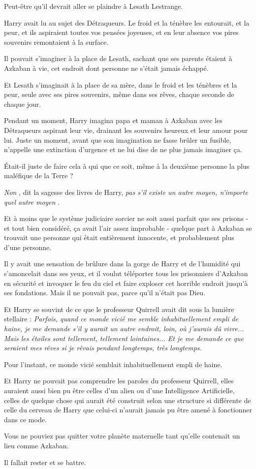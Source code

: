 Peut-être qu'il devrait aller se plaindre à Lesath Lestrange.

Harry avait lu au sujet des Détraqueurs. Le froid et la ténèbre les entourait, et la peur, et ils aspiraient toutes vos pensées joyeuses, et en leur absence vos pires souvenirs remontaient à la surface.

Il pouvait s'imaginer à la place de Lesath, sachant que ses parents étaient à Azkaban à vie, cet endroit dont personne ne s'était jamais échappé.

Et Lesath s'imaginait à la place de sa mère, dans le froid et les ténèbres et la peur, seule avec ses pires souvenirs, même dans ses rêves, chaque seconde de chaque jour.

Pendant un moment, Harry imagina papa et maman à Azkaban avec les Détraqueurs aspirant leur vie, drainant les souvenirs heureux et leur amour pour lui. Juste un moment, avant que son imagination ne fasse brûler un fusible, n'appelle une extinction d'urgence et ne lui dise de ne plus jamais imaginer ça.

Était-il juste de faire cela à qui que ce soit, même à la deuxième personne la plus maléfique de la Terre ?

\emph{Non} , dit la sagesse des livres de Harry, \emph{pas s'il existe un autre moyen, n'importe quel autre moyen} .

Et à moins que le système judiciaire sorcier ne soit aussi parfait que ses prisons - et tout bien considéré, ça avait l'air assez improbable - quelque part à Azkaban se trouvait une personne qui était entièrement innocente, et probablement plus d'une personne.

Il y avait une sensation de brûlure dans la gorge de Harry et de l'humidité qui s'amoncelait dans ses yeux, et il voulut téléporter tous les prisonniers d'Azkaban en sécurité et invoquer le feu du ciel et faire exploser cet horrible endroit jusqu'à ses fondations. Mais il ne pouvait pas, parce qu'il n'était pas Dieu.

Et Harry se souvint de ce que le professeur Quirrell avait dit sous la lumière stellaire : \emph{Parfois, quand ce monde vicié me semble inhabituellement empli de haine, je me demande s'il y aurait un autre endroit, loin, où j'aurais dû vivre... Mais les étoiles sont tellement, tellement lointaines... Et je me demande ce que seraient mes rêves si je rêvais pendant longtemps, très longtemps.} 

Pour l'instant, ce monde vicié semblait inhabituellement empli de haine.

Et Harry ne pouvait pas comprendre les paroles du professeur Quirrell, elles auraient aussi bien pu être celles d'un alien ou d'une Intelligence Artificielle, celles de quelque chose qui aurait été construit selon une structure si différente de celle du cerveau de Harry que celui-ci n'aurait jamais pu être amené à fonctionner dans ce mode.

Vous ne pouviez pas quitter votre planète maternelle tant qu'elle contenait un lieu comme Azkaban.

Il fallait rester et se battre.

